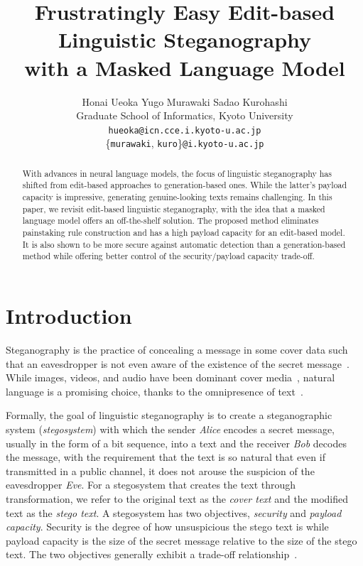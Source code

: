 \documentclass[11pt]{article}
\title{Frustratingly Easy Edit-based Linguistic Steganography\\ with a Masked Language Model}
\author{Honai Ueoka
  \hspace{13mm}Yugo Murawaki
  \hspace{13mm}Sadao Kurohashi \\
  Graduate School of Informatics, Kyoto University \\
  \texttt{hueoka@icn.cce.i.kyoto-u.ac.jp} \\
  \{\texttt{murawaki}, \texttt{kuro}\}\texttt{@i.kyoto-u.ac.jp} \\
}
\begin{document}
\maketitle
\begin{abstract}
With advances in neural language models, the focus of linguistic steganography has shifted from edit-based approaches to generation-based ones.
While the latter's payload capacity is impressive, generating genuine-looking texts remains challenging.
In this paper, we revisit edit-based linguistic steganography, with the idea that a masked language model offers an off-the-shelf solution.
The proposed method eliminates painstaking rule construction and has a high payload capacity for an edit-based model.
It is also shown to be more secure against automatic detection than a generation-based method while offering better control of the security/payload capacity trade-off.
\end{abstract}


\section{Introduction} \label{sec:intro}

Steganography is the practice of concealing a message in some cover data such that an eavesdropper is not even aware of the existence of the secret message~\citep{simmons1984prisoners,anderson1998limits}.
While images, videos, and audio have been dominant cover media~\citep{fridrich2009steganography}, natural language is a promising choice, thanks to the omnipresence of text~\citep{Bennett2004}.

Formally, the goal of linguistic steganography is to create a steganographic system (\textit{stegosystem}) with which the sender \textit{Alice} encodes a secret message, usually in the form of a bit sequence, into a text and the receiver \textit{Bob} decodes the message, with the requirement that the text is so natural that even if transmitted in a public channel, it does not arouse the suspicion of the eavesdropper \textit{Eve}.
For a stegosystem that creates the text through transformation, we refer to the original text as the \textit{cover text} and the modified text as the \textit{stego text}.
A stegosystem has two objectives, \textit{security} and \textit{payload capacity}.
Security is the degree of how unsuspicious the stego text is while payload capacity is the size of the secret message relative to the size of the stego text.
The two objectives generally exhibit a trade-off relationship~\citep{chang-clark-2014-practical}.
\end{document}
